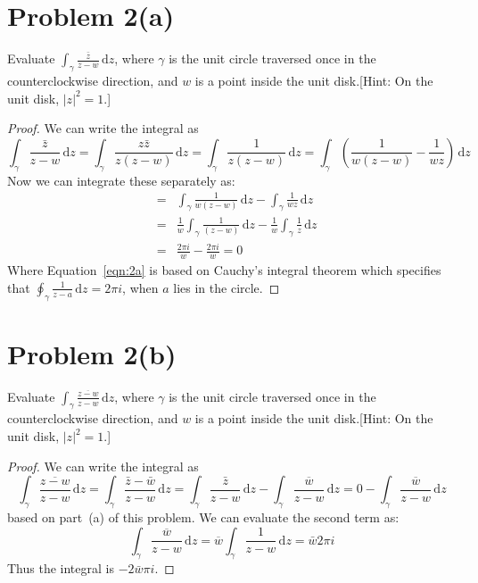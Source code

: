 \documentclass{article}[12pt]
\def\D{\mathrm{d}}
\begin{document}
\section*{Problem 2(a)} Evaluate $\int_\gamma \frac{\bar{z}}{z-w}\,\D z$,
where $\gamma$ is the unit circle traversed once in the counterclockwise
direction, and $w$ is a point inside the unit disk.[Hint: On the unit disk,
  $|z|^2=1$.]
\begin{proof}
  We can write the integral as
  \[
  \int_\gamma \frac{\bar{z}}{z-w}\,\D z = \int_\gamma \frac{z\bar{z}}{z(z-w)}\,\D z =
  \int_\gamma \frac{1}{z(z-w)}\,\D z =
  \int_\gamma \left( \frac{1}{w(z-w)} -\frac{1}{wz}\right)\,\D z
  \]
  Now we can integrate these separately as:
  \begin{eqnarray}
    & = &\int_\gamma  \frac{1}{w(z-w)}\,\D z -\int_\gamma \frac{1}{wz} \,\D z \nonumber \\
    & = &\frac{1}{w} \int_\gamma  \frac{1}{(z-w)}\,\D z -\frac{1}{w}\int_\gamma \frac{1}{z} \,\D z \nonumber \\
   & = & \frac{2\pi i}{w} - \frac{2\pi i}{w} = 0 \label{eqn:2a}
  \end{eqnarray}
  Where Equation~\ref{eqn:2a} is based on Cauchy's integral theorem which
  specifies that $\oint_\gamma \frac{1}{z-a}\, \D z = 2\pi i$, when $a$ lies
in the circle.
\end{proof}
\section*{Problem 2(b)}Evaluate $\int_\gamma \frac{\overline{z-w}}{z-w}\,\D z$,
where $\gamma$ is the unit circle traversed once in the counterclockwise
direction, and $w$ is a point inside the unit disk.[Hint: On the unit disk,
  $|z|^2=1$.]
\begin{proof}
  We can write the integral as
  \[
  \int_\gamma \frac{\overline{z-w}}{z-w}\,\D z =
  \int_\gamma \frac{\bar{z}-\bar{w}}{z-w}\,\D z =
  \int_\gamma \frac{\bar{z}}{z-w}\,\D z -  \int_\gamma \frac{\overline{w}}{z-w}\,\D z =
  0 - \int_\gamma \frac{\overline{w}}{z-w}\,\D z 
  \]
  based on part~(a) of this problem. We can evaluate the second term as:
  \[
    \int_\gamma \frac{\overline{w}}{z-w}\,\D z = \overline{w} \int_\gamma \frac{1}{z-w}\,\D z =
    \bar{w}2\pi i
  \]
  Thus the integral is $-2\bar{w}\pi i$.
\end{proof}
\end{document}
